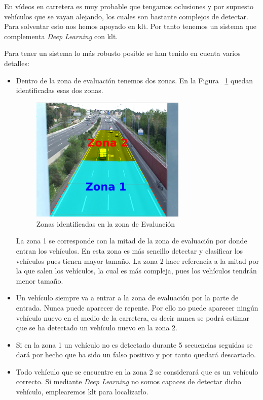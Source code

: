 En vídeos en carretera es muy probable que tengamos oclusiones y por supuesto vehículos que se vayan alejando, los cuales son bastante complejos de detectar. Para solventar esto nos hemos apoyado en \acrfull{klt}. Por tanto tenemos un sistema que complementa \textit{Deep Learning} con \acrshort{klt}. 

Para tener un sistema lo más robusto posible se han tenido en cuenta varios detalles:

\begin{itemize}
    \item Dentro de la zona de evaluación tenemos dos zonas. En la
     Figura ~\ref{fig.zona_evaluacion} quedan identificadas esas dos zonas.
    \begin{figure}[H] 
\begin{center}
	\includegraphics[width=0.7\textwidth]{figures/Diseno_global/zonas_evaluacion.png}
   \caption{Zonas identificadas en la zona de Evaluación}
	\label{fig.zona_evaluacion}
\end{center}

\end{figure}
    La zona 1 se corresponde con la mitad de la zona de evaluación por donde entran los vehículos. En esta zona es más sencillo detectar y clasificar los vehículos pues tienen mayor tamaño. La zona 2 hace referencia a la mitad por la que salen los vehículos, la cual es más compleja, pues los vehículos tendrán menor tamaño.
    \item Un vehículo siempre va a entrar a la zona de evaluación por la parte de entrada. Nunca puede aparecer de repente. Por ello no puede aparecer ningún vehículo nuevo en el medio de la carretera, es decir nunca se podrá estimar que se ha detectado un vehículo nuevo en la zona 2.
    \item Si en la zona 1 un vehículo no es detectado durante 5 secuencias seguidas se dará por hecho que ha sido un falso positivo y por tanto quedará descartado.
    \item Todo vehículo que se encuentre en la zona 2 se considerará que es un vehículo correcto. Si mediante \textit{Deep Learning} no somos capaces de detectar dicho vehículo, emplearemos \acrshort{klt} para localizarlo. 
\end{itemize}

